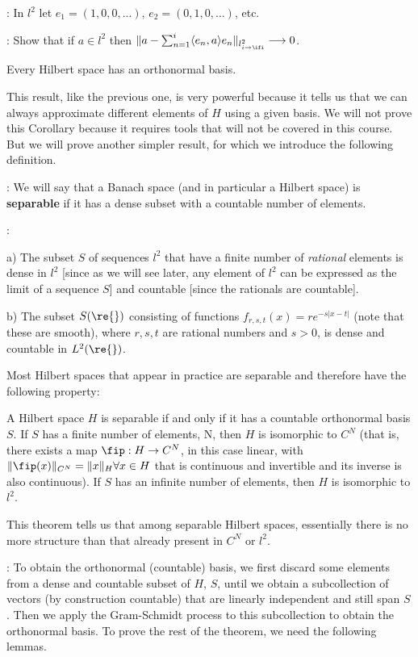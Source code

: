 \ejem: 
In $l^2$ let $e_1 = (1,0,0,...)$, $e_2 = (0,1,0,...)$, etc.

\ejer: 
Show that if $a \in l^2$ then 
$\|a-\sum_{n=1}^i\langle e_n , a \rangle e_n \|_{l^2_{i\to \ifi}} \longrightarrow 0 $.

\bcor 
Every Hilbert space has an orthonormal basis.
\ecor

This result, like the previous one, is very powerful because it tells us that
we can always approximate different elements of $H$ using a given
basis. We will not prove this Corollary because it requires tools
that will not be covered in this course. But we will prove another simpler result,
for which we introduce the following definition.

: We will say that a Banach space (and in particular a
Hilbert space) is {\bf separable} if it has a dense subset with a countable
number of elements.

\noi {}:

a) The subset $S$ of sequences $l^2$ that have a finite
number of {\sl rational} elements is dense in $l^2$ [since as we will see
later, any element of $l^2$ can be expressed as the limit
of a sequence $S$] and countable [since the rationals are countable].

b) The subset $S(\re{})$ consisting of functions 
$f_{r,s,t}(x) = re^{-s|x-t|}$ (note that these are smooth), where
$r,s,t$ are rational numbers and $s>0$, is dense and countable in 
$L^2(\re{})$.

Most Hilbert spaces that appear in practice
are separable and therefore have the following property:

\bteo 
\label{teo7.2}
A Hilbert space $H$ is separable if and only if it has a countable orthonormal 
basis $S$. If $S$ has a finite number of elements,
N, then $H$ is isomorphic to $C^N$ (that is, there exists a map 
$\fip :H \rightarrow C^N$, in this case linear, with 
$\|\fip(x)\|_{C^N} = \|x\|_H \forall x \in H$ that is continuous and invertible
and its inverse is also continuous). 
If $S$ has an infinite number of elements, then $H$ is isomorphic
to $l^2$.
\eteo

This theorem tells us that among separable Hilbert spaces, essentially
there is no more structure than that already present in $C^N$ or $l^2$.
\espa

\pru: To obtain the orthonormal (countable) basis, we first
discard some elements from a dense and countable subset of $H$, $S$, 
until we obtain a subcollection of vectors (by construction
countable) that are linearly independent and still span $S$. 
Then we apply the Gram-Schmidt process to this subcollection
to obtain the orthonormal basis. To prove the rest of the theorem, 
we need the following lemmas.

